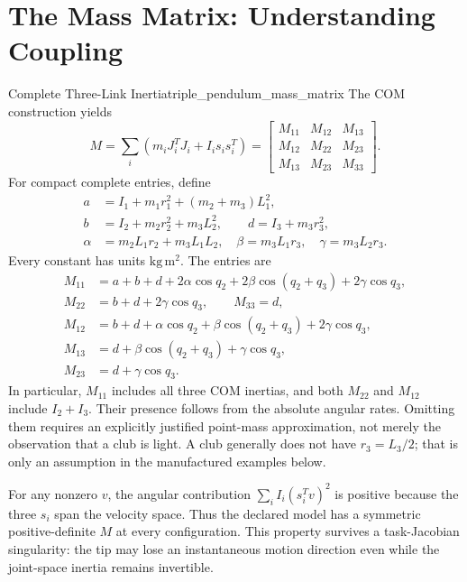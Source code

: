 \section{The Mass Matrix: Understanding Coupling}
\label{sec:triple_pendulum_mass_matrix}
\begin{definition}{Complete Three-Link Inertia}{triple_pendulum_mass_matrix}
The COM construction yields
\begin{equation}
M=\sum_i\left(m_i J_i^T J_i+I_i s_i s_i^T\right)
=\begin{bmatrix}M_{11}&M_{12}&M_{13}\\M_{12}&M_{22}&M_{23}\\M_{13}&M_{23}&M_{33}\end{bmatrix}.
\label{eq:triple_mass_matrix_structure}
\end{equation}
For compact complete entries, define
\[
\begin{aligned}
a&=I_1+m_1r_1^2+(m_2+m_3)L_1^2,\\
b&=I_2+m_2r_2^2+m_3L_2^2,\qquad d=I_3+m_3r_3^2,\\
\alpha&=m_2L_1r_2+m_3L_1L_2,\quad
\beta=m_3L_1r_3,\quad \gamma=m_3L_2r_3.
\end{aligned}
\]
Every constant has units $\mathrm{kg\,m^2}$. The entries are
\[
\begin{aligned}
M_{11}&=a+b+d+2\alpha\cos q_2+2\beta\cos(q_2+q_3)+2\gamma\cos q_3,\\
M_{22}&=b+d+2\gamma\cos q_3,\qquad M_{33}=d,\\
M_{12}&=b+d+\alpha\cos q_2+\beta\cos(q_2+q_3)+2\gamma\cos q_3,\\
M_{13}&=d+\beta\cos(q_2+q_3)+\gamma\cos q_3,\\
M_{23}&=d+\gamma\cos q_3.
\end{aligned}
\]
In particular, $M_{11}$ includes all three COM inertias, and both $M_{22}$ and $M_{12}$ include $I_2+I_3$. Their presence follows from the absolute angular rates. Omitting them requires an explicitly justified point-mass approximation, not merely the observation that a club is light. A club generally does not have $r_3=L_3/2$; that is only an assumption in the manufactured examples below.
\end{definition}

For any nonzero $v$, the angular contribution $\sum_i I_i(s_i^T v)^2$ is positive because the three $s_i$ span the velocity space. Thus the declared model has a symmetric positive-definite $M$ at every configuration. This property survives a task-Jacobian singularity: the tip may lose an instantaneous motion direction even while the joint-space inertia remains invertible.

